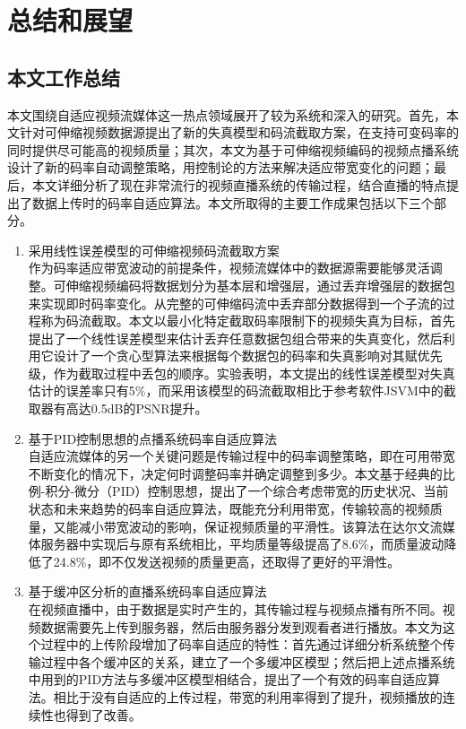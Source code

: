 \chapter{总结和展望}

\section{本文工作总结}

本文围绕自适应视频流媒体这一热点领域展开了较为系统和深入的研究。首先，本文针对可伸缩视频数据源提出了新的失真模型和码流截取方案，在支持可变码率的同时提供尽可能高的视频质量；其次，本文为基于可伸缩视频编码的视频点播系统设计了新的码率自动调整策略，用控制论的方法来解决适应带宽变化的问题；最后，本文详细分析了现在非常流行的视频直播系统的传输过程，结合直播的特点提出了数据上传时的码率自适应算法。本文所取得的主要工作成果包括以下三个部分。
\begin{enumerate}
\item {采用线性误差模型的可伸缩视频码流截取方案} \\
作为码率适应带宽波动的前提条件，视频流媒体中的数据源需要能够灵活调整。可伸缩视频编码将数据划分为基本层和增强层，通过丢弃增强层的数据包来实现即时码率变化。从完整的可伸缩码流中丢弃部分数据得到一个子流的过程称为码流截取。本文以最小化特定截取码率限制下的视频失真为目标，首先提出了一个线性误差模型来估计丢弃任意数据包组合带来的失真变化，然后利用它设计了一个贪心型算法来根据每个数据包的码率和失真影响对其赋优先级，作为截取过程中丢包的顺序。实验表明，本文提出的线性误差模型对失真估计的误差率只有5\%，而采用该模型的码流截取相比于参考软件JSVM中的截取器有高达0.5dB的PSNR提升。
\item {基于PID控制思想的点播系统码率自适应算法} \\
自适应流媒体的另一个关键问题是传输过程中的码率调整策略，即在可用带宽不断变化的情况下，决定何时调整码率并确定调整到多少。本文基于经典的比例-积分-微分（PID）控制思想，提出了一个综合考虑带宽的历史状况、当前状态和未来趋势的码率自适应算法，既能充分利用带宽，传输较高的视频质量，又能减小带宽波动的影响，保证视频质量的平滑性。该算法在达尔文流媒体服务器中实现后与原有系统相比，平均质量等级提高了8.6\%，而质量波动降低了24.8\%，即不仅发送视频的质量更高，还取得了更好的平滑性。
\item {基于缓冲区分析的直播系统码率自适应算法} \\
在视频直播中，由于数据是实时产生的，其传输过程与视频点播有所不同。视频数据需要先上传到服务器，然后由服务器分发到观看者进行播放。本文为这个过程中的上传阶段增加了码率自适应的特性：首先通过详细分析系统整个传输过程中各个缓冲区的关系，建立了一个多缓冲区模型；然后把上述点播系统中用到的PID方法与多缓冲区模型相结合，提出了一个有效的码率自适应算法。相比于没有自适应的上传过程，带宽的利用率得到了提升，视频播放的连续性也得到了改善。
\end{enumerate}


